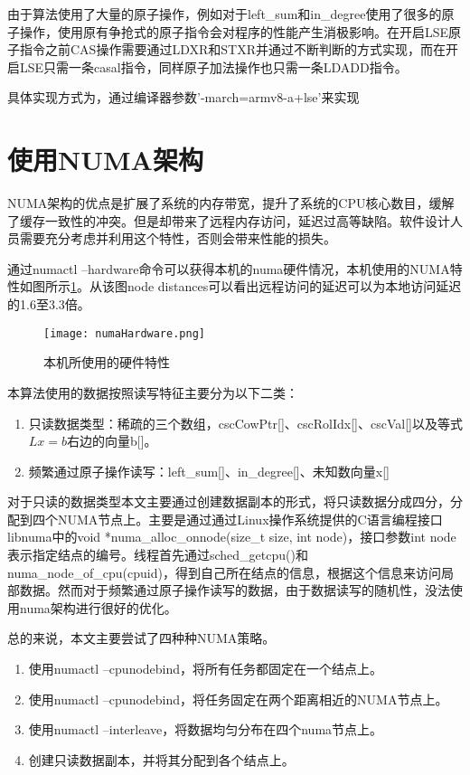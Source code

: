 由于算法使用了大量的原子操作，例如对于left\_sum和in\_degree使用了很多的原子操作，使用原有争抢式的原子指令会对程序的性能产生消极影响。在开启LSE原子指令之前CAS操作需要通过LDXR和STXR并通过不断判断的方式实现，而在开启LSE只需一条casal指令，同样原子加法操作也只需一条LDADD指令。

具体实现方式为，通过编译器参数'-march=armv8-a+lse'来实现

\section{使用NUMA架构}

NUMA架构的优点是扩展了系统的内存带宽，提升了系统的CPU核心数目，缓解了缓存一致性的冲突。但是却带来了远程内存访问，延迟过高等缺陷。软件设计人员需要充分考虑并利用这个特性，否则会带来性能的损失。

通过numactl --hardware命令可以获得本机的numa硬件情况，本机使用的NUMA特性如图所示\ref{numaHardware}。从该图node distances可以看出远程访问的延迟可以为本地访问延迟的1.6至3.3倍。

\begin{figure}[htbp]
    \centering
    \texttt{[image: numaHardware.png]}
    \caption{本机所使用的硬件特性}
    \label{numaHardware}
\end{figure}

本算法使用的数据按照读写特征主要分为以下二类：
\begin{enumerate} \setlength{\itemsep}{0pt}
    \item 只读数据类型：稀疏的三个数组，cscCowPtr[]、cscRolIdx[]、cscVal[]以及等式$Lx=b$右边的向量b[]。
    \item 频繁通过原子操作读写：left\_sum[]、in\_degree[]、未知数向量x[]
\end{enumerate}

对于只读的数据类型本文主要通过创建数据副本的形式，将只读数据分成四分，分配到四个NUMA节点上。主要是通过通过Linux操作系统提供的C语言编程接口\cite{libnuma}libnuma中的void *numa\_alloc\_onnode(size\_t size, int node)，接口参数int node表示指定结点的编号。线程首先通过sched\_getcpu()和numa\_node\_of\_cpu(cpuid)，得到自己所在结点的信息，根据这个信息来访问局部数据。然而对于频繁通过原子操作读写的数据，由于数据读写的随机性，没法使用numa架构进行很好的优化。

总的来说，本文主要尝试了四种种NUMA策略。
\begin{enumerate} \setlength{\itemsep}{0pt}
    \item 使用numactl --cpunodebind，将所有任务都固定在一个结点上。
    \item 使用numactl --cpunodebind，将任务固定在两个距离相近的NUMA节点上。
    \item 使用numactl --interleave，将数据均匀分布在四个numa节点上。
    \item 创建只读数据副本，并将其分配到各个结点上。
\end{enumerate}

